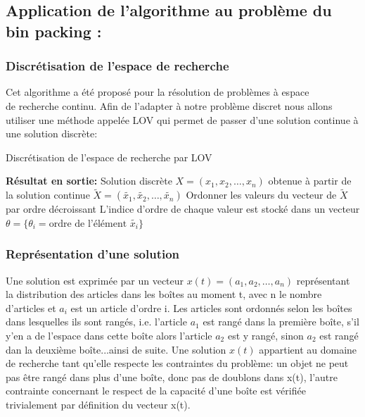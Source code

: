 \documentclass[12pt]{article}
\begin{document}
\subsection{Application de l’algorithme au problème du bin packing :}
\subsubsection{Discrétisation de l'espace de recherche}
Cet algorithme a été proposé pour la résolution de problèmes à espace \\ de recherche continu. Afin de l’adapter à notre problème discret nous allons utiliser une méthode appelée LOV qui permet de passer d’une solution continue à une solution discrète:\\
\begin{algorithm}[H]
    \caption{Discrétisation de l'espace de recherche par LOV}
    \begin{algorithmic}
        \STATE \textbf{Résultat en sortie:} Solution discrète \(X = (x_1, x_2, \dots, x_n)\) obtenue à partir de la solution continue \(\tilde{X} = (\tilde{x_1}, \tilde{x_2}, \dots, \tilde{x_n})\)\;
        \STATE Ordonner les valeurs du vecteur de \(\tilde{X}\) par ordre décroissant\;
        \STATE L'indice d'ordre de chaque valeur est stocké dans un vecteur \(\theta = \{ \theta_i = \text{ordre de l'élément } \tilde{x_i}\}\)\;
    \end{algorithmic}  
\end{algorithm}
\subsubsection{Représentation d’une solution }
Une solution est exprimée par un vecteur $ x(t)=(a_1, a_2, …, a_n)$ représentant la distribution des articles dans les boîtes au moment t, avec n le nombre d’articles et $a_i$ est un article d’ordre i. Les articles sont ordonnés selon les boîtes dans lesquelles ils sont rangés, i.e. l’article $a_1$ est rangé dans la première boîte, s’il y’en a de l’espace dans cette boîte alors l’article $a_2$ est y rangé, sinon $a_2$ est rangé dan la deuxième boîte...ainsi de suite. 
Une solution \(x(t)\) appartient au domaine de recherche tant qu’elle respecte les contraintes du problème: un objet ne peut pas être rangé dans plus d’une boîte, donc pas de doublons dans x(t), l’autre contrainte concernant le respect de la capacité d’une boîte est vérifiée trivialement par définition du vecteur x(t).
\end{document}
